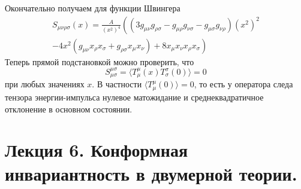 \documentclass[a4paper,12pt]{article}
\theoremstyle{definition}
\theoremstyle{definition}
\theoremstyle{definition}
\begin{document}
Окончательно получаем для функции Швингера
\begin{multline}
  \label{eq:221}
  S_{\mu\nu\rho\sigma}(x)=\frac{A}{(x^{2})^{4}} \left( (3g_{\mu\nu} g_{\rho\sigma}-g_{\mu\rho}g_{\nu\sigma}-g_{\mu\sigma}g_{\nu\rho}) (x^{2})^{2} 
  \right. \\
  \left.-4 x^{2} (g_{\mu\nu} x_{\rho}x_{\sigma} +g_{\rho\sigma}x_{\mu}x_{\nu}) +8 x_{\mu}x_{\nu}x_{\rho}x_{\sigma}\right)
\end{multline}
Теперь прямой подстановкой можно проверить, что
\begin{equation}
  \label{eq:222}
  S^{\mu\sigma}_{\mu\sigma}=\langle T^{\mu}_{\mu}(x) T^{\sigma}_{\sigma}(0)\rangle=0
\end{equation}
при любых значениях $x$. В частности $\langle T^{\mu}_{\mu}(0)\rangle=0$, то есть у оператора следа
тензора энергии-импульса нулевое матожидание и среднеквадратичное отклонение в основном состоянии. 

\section{Лекция 6. Конформная инвариантность в двумерной теории.}
\label{sec:lecture-6}
\end{document}
